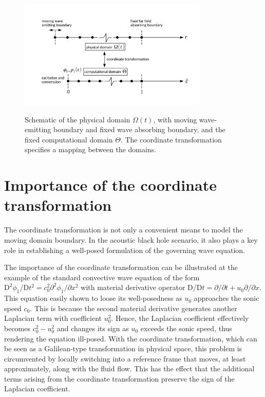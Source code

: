 \begin{figure}
{\includegraphics[width=0.8\textwidth]{figures/domains.pdf}}
\caption{Schematic of the physical domain $\Omega\left(t\right)$, with moving wave-emitting boundary and fixed wave absorbing boundary, and the fixed computational domain $\Theta$. The coordinate transformation specifies a mapping between the domains.}
\label{fig:domains}
\end{figure}


\section{Importance of the coordinate transformation}
\label{sec:Importance of the coordinate transformation}

The coordinate transformation is not only a convenient means to model the moving domain boundary. In the acoustic black hole scenario, it also plays a key role in establishing a well-posed formulation of the governing wave equation. 

The importance of the coordinate transformation can be illustrated at the example of the standard convective wave equation of the form $\mathrm{D}^2\phi_1/\mathrm{D}t^2 = c_0^2\partial^2\phi_1/\partial x^2$ with material derivative operator $\mathrm{D}/\mathrm{D}t = \partial/\partial t + u_0\partial/\partial x$. This equation easily shown to loose its well-posedness as $u_0$ approaches the sonic speed $c_0$. This is because the second material derivative generates another Laplacian term with coefficient $u_0^2$. Hence, the Laplacian coefficient effectively becomes $c_0^2-u_0^2$ and changes its sign as $u_0$ exceeds the sonic speed, thus rendering the equation ill-posed. With the coordinate transformation, which can be seen as a Galilean-type transformation in physical space, this problem is circumvented by locally switching into a reference frame that moves, at least approximately, along with the fluid flow. This has the effect that the additional terms arising from the coordinate transformation preserve the sign of the Laplacian coefficient.